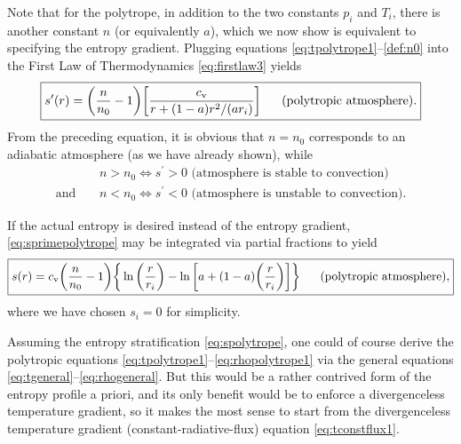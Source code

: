 \documentclass[12pt]{article} %
\newcommand{\cv}{c_{\rm{v}}}
\newcommand{\andd}{\text{and}\ \ \ \ \ }
\begin{document}
Note that for the polytrope, in addition to the two constants $p_i$ and $T_i$, there is another constant $n$ (or equivalently $a$), which we now show is equivalent to specifying the entropy gradient. Plugging equations \eqref{eq:tpolytrope1}--\eqref{def:n0} into the First Law of Thermodynamics \eqref{eq:firstlaw3} yields
\begin{align}
\boxed{
s^\prime(r) = \bigg{(}\frac{n}{n_0} - 1\bigg{)}\bigg{[}\frac{\cv}{r+(1-a)r^2/(ar_i)}\bigg{]} \ \ \ \ \ \text{(polytropic atmosphere).}
}
\label{eq:sprimepolytrope}
\end{align}
From the preceding equation, it is obvious that $n=n_0$ corresponds to an adiabatic atmosphere (as we have already shown), while
\begin{align}
&n > n_0 \Longleftrightarrow s^\prime > 0 \text{ (atmosphere is stable to convection)}\\
\andd &n < n_0 \Longleftrightarrow s^\prime < 0 \text{ (atmosphere is unstable to convection).}
\end{align}

If the actual entropy is desired instead of the entropy gradient, \eqref{eq:sprimepolytrope} may be integrated via partial fractions to yield
\begin{align}
\boxed{
s(r) = \cv\bigg{(}\frac{n}{n_0} - 1\bigg{)}\bigg{\{}\ln{\bigg{(}\frac{r}{r_i}\bigg{)}} - \ln{\bigg{[}a+(1-a)\bigg{(}\frac{r}{r_i}\bigg{)}\bigg{]}}\bigg{\}}\ \ \ \ \ \text{(polytropic atmosphere)},
}
\label{eq:spolytrope}
\end{align}
where we have chosen $s_i=0$ for simplicity.

Assuming the entropy stratification \eqref{eq:spolytrope}, one could of course derive the polytropic equations \eqref{eq:tpolytrope1}--\eqref{eq:rhopolytrope1} via the general equations \eqref{eq:tgeneral}--\eqref{eq:rhogeneral}. But this would be a rather contrived form of the entropy profile a priori, and its only benefit would be to enforce a divergenceless temperature gradient, so it makes the most sense to start from the divergenceless temperature gradient (constant-radiative-flux) equation \eqref{eq:tconstflux1}. 
\end{document}
